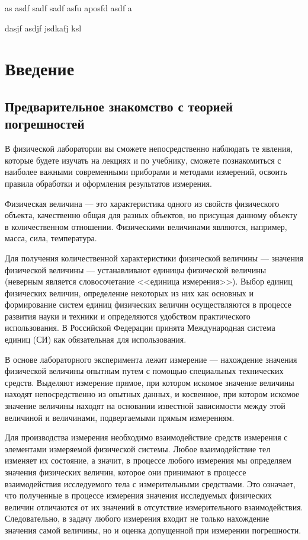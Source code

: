 \documentclass[a4paper, 12pt]{extarticle}
\begin{document}
as asdf sadf sadf asfu aposfd asdf a

dasjf asdjf jsdkafj ksl

\newpage


\setcounter{section}{0} %
\section*{Введение}
\subsection{Предварительное знакомство с теорией погрешностей}
В физической лаборатории вы сможете непосредственно наблюдать те явления, которые будете изучать на лекциях и по учебнику, сможете познакомиться с наиболее важными современными приборами и методами измерений, освоить правила обработки и оформления результатов измерения.

 Физическая величина ---  это характеристика одного из свойств физического объекта, качественно общая для разных объектов, но присущая данному объекту в количественном отношении. Физическими величинами являются, например, масса, сила, температура.

  Для получения количественной характеристики физической величины ---  значения физической величины ---  устанавливают единицы физической величины (неверным является словосочетание <<единица измерения>>). Выбор единиц физических величин, определение некоторых из них как основных и формирование систем единиц физических величин осуществляются в процессе развития науки и техники и определяются удобством практического использования. В Российской Федерации принята Международная система единиц (СИ) как обязательная для использования.


  В основе лабораторного эксперимента лежит измерение ---  нахождение значения физической величины опытным путем с помощью специальных технических средств. Выделяют измерение прямое, при котором искомое значение величины находят непосредственно из опытных данных, и косвенное, при котором искомое значение величины находят на основании известной зависимости между этой величиной и величинами, подвергаемыми прямым измерениям.



Для производства измерения необходимо взаимодействие средств измерения с элементами измеряемой физической системы. Любое взаимодействие тел изменяет их состояние, а значит, в процессе любого измерения мы определяем значения физических величин, которое они принимают в процессе взаимодействия исследуемого тела с измерительными средствами. Это означает, что полученные в процессе измерения значения исследуемых физических величин отличаются от их значений в отсутствие измерительного взаимодействия. Следовательно, в задачу любого измерения входит не только нахождение значения самой величины, но и оценка допущенной при измерении погрешности.
\end{document}
